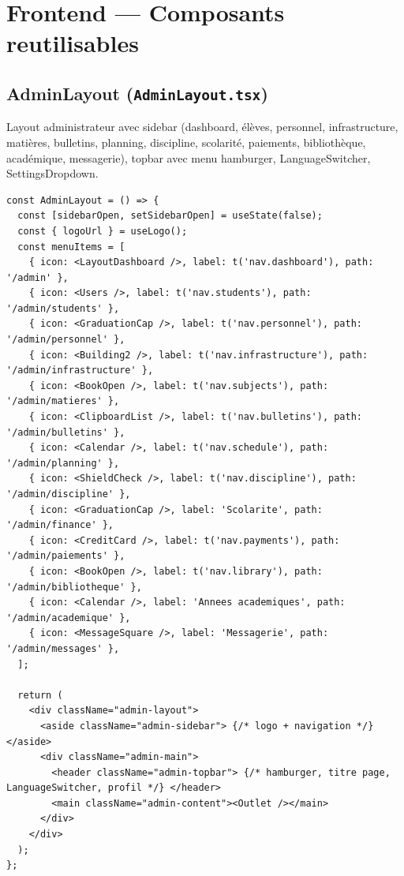 \documentclass[12pt,a4paper]{article}
\begin{document}
\newpage

\section{Frontend --- Composants reutilisables}

\subsection{AdminLayout (\texttt{AdminLayout.tsx})}

Layout administrateur avec sidebar (dashboard, élèves, personnel, infrastructure, matières, bulletins, planning, discipline, scolarité, paiements, bibliothèque, académique, messagerie), topbar avec menu hamburger, LanguageSwitcher, SettingsDropdown.

\begin{lstlisting}[style=code]
const AdminLayout = () => {
  const [sidebarOpen, setSidebarOpen] = useState(false);
  const { logoUrl } = useLogo();
  const menuItems = [
    { icon: <LayoutDashboard />, label: t('nav.dashboard'), path: '/admin' },
    { icon: <Users />, label: t('nav.students'), path: '/admin/students' },
    { icon: <GraduationCap />, label: t('nav.personnel'), path: '/admin/personnel' },
    { icon: <Building2 />, label: t('nav.infrastructure'), path: '/admin/infrastructure' },
    { icon: <BookOpen />, label: t('nav.subjects'), path: '/admin/matieres' },
    { icon: <ClipboardList />, label: t('nav.bulletins'), path: '/admin/bulletins' },
    { icon: <Calendar />, label: t('nav.schedule'), path: '/admin/planning' },
    { icon: <ShieldCheck />, label: t('nav.discipline'), path: '/admin/discipline' },
    { icon: <GraduationCap />, label: 'Scolarite', path: '/admin/finance' },
    { icon: <CreditCard />, label: t('nav.payments'), path: '/admin/paiements' },
    { icon: <BookOpen />, label: t('nav.library'), path: '/admin/bibliotheque' },
    { icon: <Calendar />, label: 'Annees academiques', path: '/admin/academique' },
    { icon: <MessageSquare />, label: 'Messagerie', path: '/admin/messages' },
  ];

  return (
    <div className="admin-layout">
      <aside className="admin-sidebar"> {/* logo + navigation */} </aside>
      <div className="admin-main">
        <header className="admin-topbar"> {/* hamburger, titre page, LanguageSwitcher, profil */} </header>
        <main className="admin-content"><Outlet /></main>
      </div>
    </div>
  );
};
\end{lstlisting}
\end{document}

